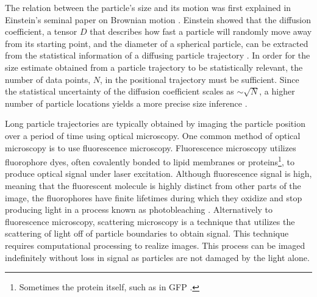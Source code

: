 The relation between the particle's size and its motion was first explained in Einstein's seminal paper on Brownian motion \cite{einstein1956investigations}. Einstein showed that the diffusion coefficient, a tensor $D$ that describes how fast a particle will randomly move away from its starting point, and the diameter of a spherical particle, can be extracted from the statistical information of a diffusing particle trajectory \cite{bian111YearsBrownian2016}. In order for the size estimate obtained from a particle trajectory to be statistically relevant, the number of data points, $N$, in the positional trajectory must be sufficient. Since the statistical uncertainty of the diffusion coefficient scales as $\sim\!\!\sqrt{N}$, a higher number of particle locations yields a more precise size inference \cite{vestergaardOptimalEstimationDiffusion2014}.  %

Long particle trajectories are typically obtained by imaging the particle position over a period of time using optical microscopy. One common method of optical microscopy is to use fluorescence microscopy. Fluorescence microscopy utilizes fluorophore dyes, often covalently bonded to lipid membranes or proteins\footnote{Sometimes the protein itself, such as in GFP \cite{chalfie1994green}.}, to produce optical signal under laser excitation. Although fluorescence signal is high, meaning that the fluorescent molecule is highly distinct from other parts of the image, the fluorophores have finite lifetimes during which they oxidize and stop producing light in a process known as photobleaching \cite{taylor_interferometric_2018}. Alternatively to fluorescence microscopy, scattering microscopy is a technique that utilizes the scattering of light off of particle boundaries to obtain signal. This technique requires computational processing to realize images. 
This process can be imaged indefinitely without loss in signal as particles are not damaged by the light alone.


